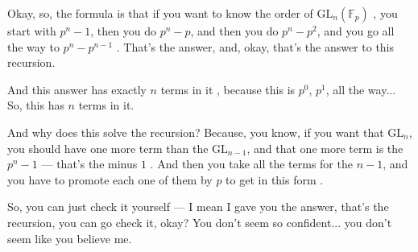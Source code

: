 \begin{speech}[01:20:41 - 01:22:06]
Okay, so, the formula is that if you want to know the order of $\mathrm{GL}_n(\mathbb{F}_p)$ , you start with $p^n - 1$, then you do $p^n - p$, and then you do $p^n - p^2$, and you go all the way to $p^n - p^{n-1}$ . That's the answer, and, okay, that's the answer to this recursion.

And this answer has exactly $n$ terms in it , because this is $p^0$, $p^1$, all the way... So, this has $n$ terms in it.

And why does this solve the recursion? Because, you know, if you want that $\mathrm{GL}_n$, you should have one more term than the $\mathrm{GL}_{n-1}$, and that one more term is the $p^n - 1$ --- that's the minus $1$ . And then you take all the terms for the $n - 1$, and you have to promote each one of them by $p$ to get in this form .

So, you can just check it yourself --- I mean I gave you the answer, that's the recursion, you can go check it, okay? You don't seem so confident... you don't seem like you believe me. 
\end{speech}

